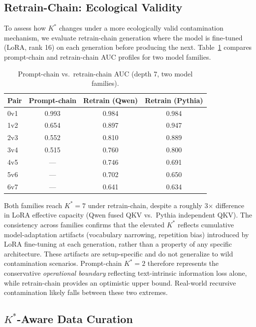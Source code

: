 \documentclass[11pt,a4paper]{article}
\begin{document}
\subsection{Retrain-Chain: Ecological Validity}\label{sec:retrain}

To assess how $K^*$ changes under a more ecologically valid contamination mechanism, we evaluate retrain-chain generation where the model is fine-tuned (LoRA, rank 16) on each generation before producing the next. Table~\ref{tab:retrain} compares prompt-chain and retrain-chain AUC profiles for two model families.

\begin{table}[t]
\centering
\small
\caption{Prompt-chain vs.\ retrain-chain AUC (depth 7, two model families).}
\label{tab:retrain}
\begin{tabular}{lccc}
\toprule
Pair & Prompt-chain & Retrain (Qwen) & Retrain (Pythia) \\
\midrule
0v1 & 0.993 & 0.984 & 0.984 \\
1v2 & 0.654 & 0.897 & 0.947 \\
2v3 & 0.552 & 0.810 & 0.889 \\
3v4 & 0.515 & 0.760 & 0.800 \\
4v5 &  ---  & 0.746 & 0.691 \\
5v6 &  ---  & 0.702 & 0.650 \\
6v7 &  ---  & 0.641 & 0.634 \\
\bottomrule
\end{tabular}
\end{table}

Both families reach $K^*\!=\!7$ under retrain-chain, despite a roughly 3$\times$ difference in LoRA effective capacity (Qwen fused QKV vs.\ Pythia independent QKV). The consistency across families confirms that the elevated $K^*$ reflects cumulative model-adaptation artifacts (vocabulary narrowing, repetition bias) introduced by LoRA fine-tuning at each generation, rather than a property of any specific architecture. These artifacts are setup-specific and do not generalize to wild contamination scenarios. Prompt-chain $K^*\!=\!2$ therefore represents the conservative \emph{operational boundary} reflecting text-intrinsic information loss alone, while retrain-chain provides an optimistic upper bound. Real-world recursive contamination likely falls between these two extremes.


\subsection{$K^*$-Aware Data Curation}\label{sec:curation}
\end{document}
